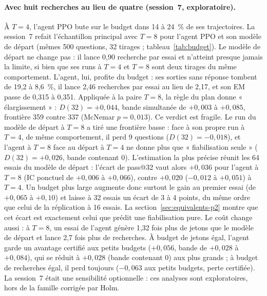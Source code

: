 \paragraph{Avec huit recherches au lieu de quatre (session~7, exploratoire).} À $T = 4$, l'agent PPO bute sur le budget dans 14 à 24~\% de ses trajectoires. La session~7 refait l'échantillon principal avec $T = 8$ pour l'agent PPO et son modèle de départ (mêmes 500 questions, 32 tirages ; tableau~\ref{tab:budget}). Le modèle de départ ne change pas : il lance 0,90 recherche par essai et n'atteint presque jamais la limite, si bien que ses runs à $T = 4$ et $T = 8$ sont deux tirages du même comportement. L'agent, lui, profite du budget : ses sorties sans réponse tombent de 19,2 à 8,6~\%, il lance 2,46 recherches par essai au lieu de 2,17, et son EM passe de 0,315 à 0,351. Appliquée à la paire $T = 8$, la règle du plan donne « élargissement » : $D(32) = +0{,}044$, bande simultanée de $+0{,}003$ à $+0{,}085$, frontière 359 contre 337 (McNemar $p = 0{,}013$). Ce verdict est fragile. Le run du modèle de départ à $T = 8$ a tiré une frontière basse : face à son propre run à $T = 4$, de même comportement, il perd 9 questions ($D(32) = -0{,}018$), et l'agent à $T = 8$ face au départ à $T = 4$ ne donne plus que « fiabilisation seule » ($D(32) = +0{,}026$, bande contenant 0). L'estimation la plus précise réunit les 64 essais du modèle de départ : l'écart de pass@32 vaut alors $+0{,}036$ pour l'agent à $T = 8$ (IC ponctuel de $+0{,}006$ à $+0{,}066$), contre $+0{,}020$ ($-0{,}012$ à $+0{,}051$) à $T = 4$. Un budget plus large augmente donc surtout le gain au premier essai (de $+0{,}065$ à $+0{,}10$) et laisse à 32 essais un écart de 3 à 4 points, du même ordre que celui de la réplication à 16 essais. La section~\ref{sec:equivalents-p2} montre que cet écart est exactement celui que prédit une fiabilisation pure. Le coût change aussi : à $T = 8$, un essai de l'agent génère 1,32 fois plus de jetons que le modèle de départ et lance 2,7 fois plus de recherches. À budget de jetons égal, l'agent garde un avantage certifié aux petits budgets ($+0{,}056$, bande de $+0{,}028$ à $+0{,}084$), qui se réduit à $+0{,}028$ (bande contenant 0) aux plus grands ; à budget de recherches égal, il perd toujours ($-0{,}063$ aux petits budgets, perte certifiée). La session~7 était une sensibilité optionnelle : ces analyses sont exploratoires, hors de la famille corrigée par Holm.

